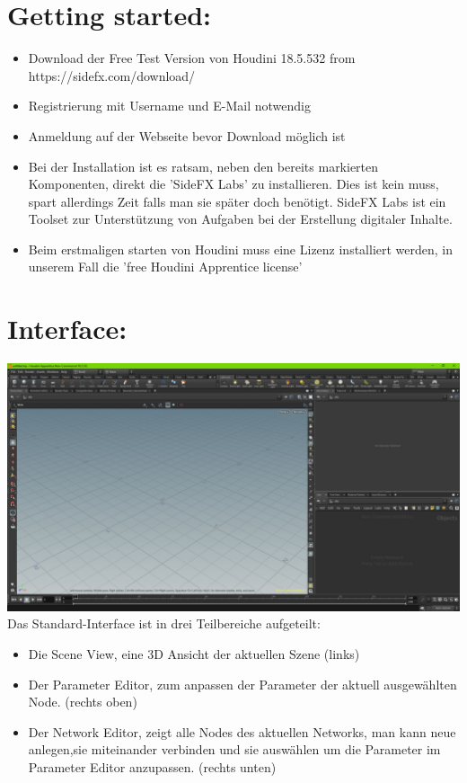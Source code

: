 \documentclass[paper=a4,fontsize=12pt,ngerman]{scrartcl}
\begin{document}
	\pagestyle{plain}
	
	
	
	\section*{\textcolor{rosa}{Getting started:}}
	\begin{itemize}
		\item Download der Free Test Version von Houdini 18.5.532 from https://sidefx.com/download/
		\item Registrierung mit Username und E-Mail notwendig
		\item Anmeldung auf der Webseite bevor Download möglich ist
		\item Bei der Installation ist es ratsam, neben den bereits markierten Komponenten, direkt die 'SideFX Labs' zu installieren. Dies ist kein muss, spart allerdings Zeit falls man sie später doch benötigt. SideFX Labs ist ein Toolset zur Unterstützung von Aufgaben bei der Erstellung digitaler Inhalte. 
		\item Beim erstmaligen starten von Houdini muss eine Lizenz installiert werden, in unserem Fall die 'free Houdini Apprentice license'
	\end{itemize}

	\section*{\textcolor{rosa}{Interface:}}
	\includegraphics[width=\textwidth]{graphics/Interface.jpg}
	Das Standard-Interface ist in drei Teilbereiche aufgeteilt: 
	\begin{itemize}
		\item Die Scene View, eine 3D Ansicht der aktuellen Szene (links)
		\item Der Parameter Editor, zum anpassen der Parameter der aktuell ausgewählten Node. (rechts oben)
		\item Der Network Editor, zeigt alle Nodes des aktuellen Networks, man kann neue anlegen,sie miteinander verbinden und sie auswählen um die Parameter im Parameter Editor anzupassen. (rechts unten)
	\end{itemize}
		
		
\end{document}
